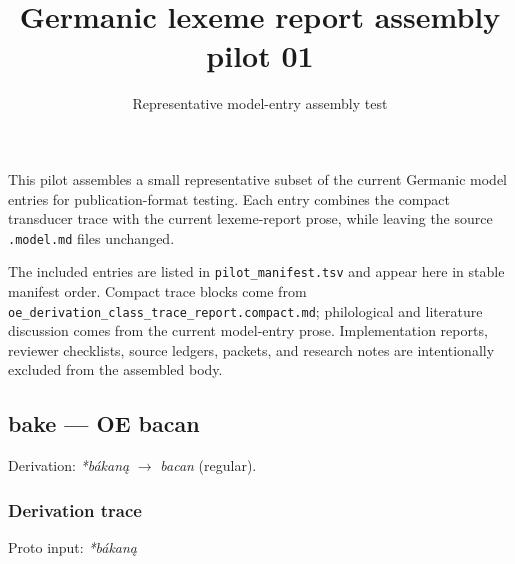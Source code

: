 \documentclass[
  british,
  a4paper,
]{article}
\title{Germanic lexeme report assembly pilot 01}
\subtitle{Representative model-entry assembly test}
\author{}
\date{}
\begin{document}
\maketitle

This pilot assembles a small representative subset of the current
Germanic model entries for publication-format testing. Each entry
combines the compact transducer trace with the current lexeme-report
prose, while leaving the source \texttt{.model.md} files unchanged.

The included entries are listed in \texttt{pilot\_manifest.tsv} and
appear here in stable manifest order. Compact trace blocks come from
\texttt{oe\_derivation\_class\_trace\_report.compact.md}; philological
and literature discussion comes from the current model-entry prose.
Implementation reports, reviewer checklists, source ledgers, packets,
and research notes are intentionally excluded from the assembled body.

\subsection{bake --- OE bacan}\label{bake-oe-bacan}

Derivation: \emph{*bákaną} \(\rightarrow\) \emph{bacan} (regular).

\subsubsection{Derivation trace}\label{derivation-trace}

Proto input: \emph{*bákaną}

\begingroup
\setlength{\fboxsep}{6pt}
\end{document}
